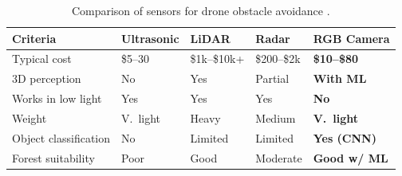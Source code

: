 \begin{table}[H]
    \small
    \centering
    \caption{Comparison of sensors for drone obstacle avoidance \cite{Butt2024,Hrabar2012,Kumar2023,Sastry2025}.}
    \label{tab:sensors}
    \begin{tabular}{p{4cm} p{2cm} p{2cm} p{2cm} p{2.5cm}}
        \hline\hline
        \rowcolor{lightgray}\textbf{Criteria} & \textbf{Ultrasonic} & \textbf{LiDAR} & \textbf{Radar} & \textbf{RGB Camera} \\\hline
        Typical cost & \$5--30 & \$1k--\$10k+ & \$200--\$2k & \textbf{\$10--\$80} \\
        \rowcolor{lightlightgray} 3D perception & No & Yes & Partial & \textbf{With ML} \\
        Works in low light & Yes & Yes & Yes & \textbf{No} \\
        \rowcolor{lightlightgray} Weight & V.\ light & Heavy & Medium & \textbf{V.\ light} \\
        Object classification & No & Limited & Limited & \textbf{Yes (CNN)} \\
        \rowcolor{lightlightgray} Forest suitability & Poor & Good & Moderate & \textbf{Good w/ ML} \\
        \hline
    \end{tabular}
\end{table}
